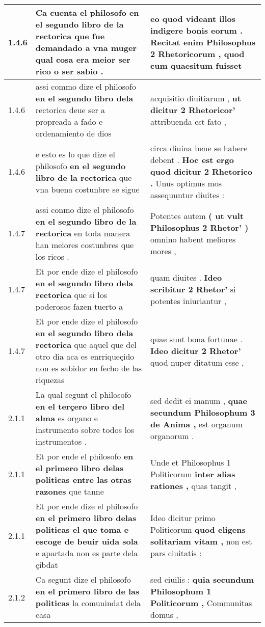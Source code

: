 \begin{tabular}{|p{1cm}|p{6.5cm}|p{6.5cm}|}
1.4.6 & Ca cuenta el philosofo \textbf{ en el segundo libro de la rectorica } que fue demandado a vna muger qual cosa era meior ser rico o ser sabio . & eo quod videant illos indigere bonis eorum . \textbf{ Recitat enim Philosophus 2 Rhetoricorum , } quod cum quaesitum fuisset \\\hline
1.4.6 & assi commo dize el philosofo \textbf{ en el segundo libro dela } rectorica deue ser a propreada a fado e ordenamiento de dios & acquisitio diuitiarum , \textbf{ ut dicitur 2 Rhetoricor’ } attribuenda est fato , \\\hline
1.4.6 & e esto es lo que dize el philosofo \textbf{ en el segundo libro de la rectorica } que vna buena costunbre se sigue & circa diuina bene se habere debent . \textbf{ Hoc est ergo quod dicitur 2 Rhetorico . } Unus optimus mos assequuntur diuites : \\\hline
1.4.7 & assi conmo dize el philosofo \textbf{ en el segundo libro de la rectorica } en toda manera han meiores costunbres que los ricos . & Potentes autem \textbf{ ( ut vult Philosophus 2 Rhetor’ ) } omnino habent meliores mores , \\\hline
1.4.7 & Et por ende dize el philosofo \textbf{ en el segundo libro dela rectorica } que si los poderosos fazen tuerto a & quam diuites . \textbf{ Ideo scribitur 2 Rhetor’ } si potentes iniuriantur , \\\hline
1.4.7 & Et por ende dize el philosofo \textbf{ en el segundo libro dela rectorica } que aquel que del otro dia aca es enrriqueçido non es sabidor en fecho de las riquezas & quae sunt bona fortunae . \textbf{ Ideo dicitur 2 Rhetor’ } quod nuper ditatum esse , \\\hline
2.1.1 & La qual segunt el philosofo \textbf{ en el terçero libro del alma } es organo e instrumento sobre todos los instrumentos . & sed dedit ei manum , \textbf{ quae secundum Philosophum 3 de Anima , } est organum organorum . \\\hline
2.1.1 & Et por ende el philosofo \textbf{ en el primero libro delas politicas entre las otras razones } que tanne & Unde et Philosophus 1 Politicorum \textbf{ inter alias rationes , } quas tangit , \\\hline
2.1.1 & Et por ende dize el philosofo \textbf{ en el primero libro delas politicas el que toma e escoge de beuir uida sola } e apartada non es parte dela çibdat & Ideo dicitur primo Politicorum \textbf{ quod eligens solitariam vitam , } non est pars ciuitatis : \\\hline
2.1.2 & Ca segunt dize el philosofo \textbf{ en el primero libro de las politicas } la comunindat dela casa & sed ciuilis : \textbf{ quia secundum Philosophum 1 Politicorum , } Communitas domus , \\\hline

\end{tabular}
